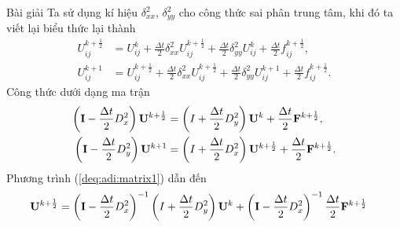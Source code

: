 \documentclass[9pt]{beamer}
\numberwithin{equation}{section}
\begin{document}
\begin{frame}
\begin{exampleblock}{Bài giải}
    Ta sử dụng kí hiệu $\delta_{xx}^2$, $\delta_{yy}^2$ cho công thức sai phân trung tâm, khi đó ta viết lại biểu thức lại thành
    \begin{align}
        U_{ij}^{k+\frac{1}{2}} &= U_{ij}^k +
        \frac{\Delta t}{2} \delta_{xx}^2 U_{ij}^{k+\frac{1}{2}} +
        \frac{\Delta t}{2} \delta_{yy}^2 U_{ij}^k +
        \frac{\Delta t}{2} f_{ij}^{k+\frac{1}{2}}, \label{deq:adi:cdf1} \\
        U_{ij}^{k+1} &= U_{ij}^{k+\frac{1}{2}} +
        \frac{\Delta t}{2} \delta_{xx}^2 U_{ij}^{k+\frac{1}{2}} +
        \frac{\Delta t}{2} \delta_{yy}^2 U_{ij}^{k+1} +
        \frac{\Delta t}{2} f_{ij}^{k+\frac{1}{2}}. \label{deq:adi:cdf2}
    \end{align}
    Công thức dưới dạng ma trận
    \begin{align}
        \left({\bf I} - \frac{\Delta t}{2} D_x^2\right) {\bf U}^{k+\frac{1}{2}} &=
        \left(I + \frac{\Delta t}{2} D_y^2\right) {\bf U}^k +
        \frac{\Delta t}{2} {\bf F}^{k+\frac{1}{2}}, \label{deq:adi:matrix1} \\
        \left({\bf I} - \frac{\Delta t}{2} D_y^2\right) {\bf U}^{k+1} &=
        \left(I + \frac{\Delta t}{2} D_x^2\right) {\bf U}^{k+\frac{1}{2}} +
        \frac{\Delta t}{2} {\bf F}^{k+\frac{1 }{2}}. \label{deq:ad:matrix2}
    \end{align}
    Phương trình (\ref{deq:adi:matrix1}) dẫn đến
    \begin{align*}
        {\bf U}^{k+\frac{1}{2}} &=
        \left({\bf I} - \frac{\Delta t}{2} D_x^2\right)^{-1} \left(I + \frac{\Delta t}{2} D_y^2\right) {\bf U}^k +
        \left({\bf I} - \frac{\Delta t}{2} D_x^2\right)^{-1} \frac{\Delta t}{2} {\bf F}^{k+\frac{1}{2}}
    \end{align*}
\end{exampleblock}
\end{frame}
\end{document}

